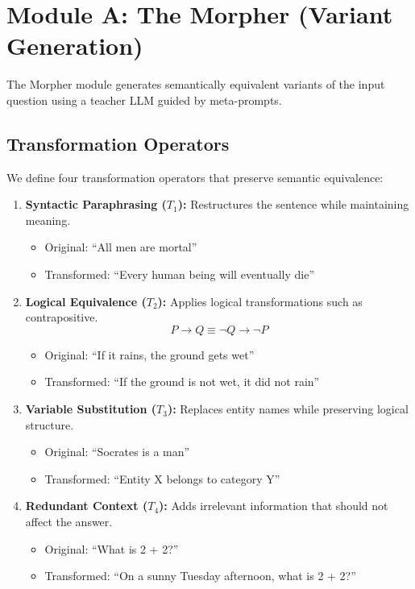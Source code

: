\section{Module A: The Morpher (Variant Generation)}

The Morpher module generates semantically equivalent variants of the input question using a teacher LLM guided by meta-prompts.

\subsection{Transformation Operators}

We define four transformation operators that preserve semantic equivalence:

\begin{enumerate}
    \item \textbf{Syntactic Paraphrasing ($T_1$):} Restructures the sentence while maintaining meaning.
    \begin{itemize}
        \item Original: ``All men are mortal''
        \item Transformed: ``Every human being will eventually die''
    \end{itemize}

    \item \textbf{Logical Equivalence ($T_2$):} Applies logical transformations such as contrapositive.
    \begin{equation}
        P \rightarrow Q \equiv \neg Q \rightarrow \neg P
    \end{equation}
    \begin{itemize}
        \item Original: ``If it rains, the ground gets wet''
        \item Transformed: ``If the ground is not wet, it did not rain''
    \end{itemize}

    \item \textbf{Variable Substitution ($T_3$):} Replaces entity names while preserving logical structure.
    \begin{itemize}
        \item Original: ``Socrates is a man''
        \item Transformed: ``Entity X belongs to category Y''
    \end{itemize}

    \item \textbf{Redundant Context ($T_4$):} Adds irrelevant information that should not affect the answer.
    \begin{itemize}
        \item Original: ``What is 2 + 2?''
        \item Transformed: ``On a sunny Tuesday afternoon, what is 2 + 2?''
    \end{itemize}
\end{enumerate}

